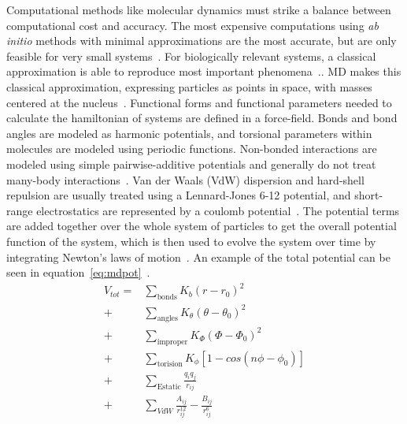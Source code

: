 \documentclass[12pt,openany,final]{book}
\begin{document}
Computational methods like molecular dynamics must strike a balance between computational cost and accuracy. The most expensive
computations using \emph{ab initio} methods with minimal approximations are the most accurate, but are only feasible for very small systems~\cite{dror:2012:biomicroscope}.
For biologically relevant systems, a classical approximation is able to reproduce most important phenomena~\cite{pandit:2008:simulationtextbook,dror:2012:biomicroscope}..
MD makes this classical approximation, expressing particles as points in space, 
with masses centered at the nucleus~\cite{pandit:2008:simulationtextbook}.
Functional forms and functional parameters needed to calculate the hamiltonian of systems are defined in a force-field.
Bonds and bond angles are modeled as harmonic potentials, and torsional parameters within molecules are modeled
using periodic functions. Non-bonded interactions
are modeled using simple pairwise-additive potentials and generally do not treat many-body interactions~\cite{tieleman:1997:memsim,pandit:2008:simulationtextbook}. 
Van der Waals (VdW) dispersion and hard-shell repulsion are usually treated using a Lennard-Jones 6-12 potential,
and short-range electrostatics are represented by a coulomb potential~\cite{tieleman:1997:memsim,pandit:2008:simulationtextbook}.
The potential terms are added together over the whole system of particles
to get the overall potential function of the system, which is then used to evolve the system over time by integrating
Newton's laws of motion~\cite{frenkel:2001:molsimbook}. An example of the total potential can be seen in equation~\ref{eq:mdpot}~\cite{pandit:2008:simulationtextbook}.
\begin{equation}
    \label{eq:mdpot}
\begin{aligned}
    V_{tot}=&\sum_{\text{bonds}}K_b(r-r_0)^2 \\+& \sum_{\text{angles}}K_{\theta}(\theta - \theta_0)^2 \\+& \sum_{\text{improper}}K_\Phi(\Phi-\Phi_0)^2
    \\+& \sum_{\text{torision}}K_\phi[1-cos(n\phi-\phi_0)] \\+& \sum_{\text{Estatic}}\frac{q_iq_j}{r_{ij}} \\+& \sum_{VdW}\frac{A_{ij}}{r^{12}_{ij}}-\frac{B_{ij}}{r^6_{ij}}
\end{aligned}
\end{equation}
\end{document}
